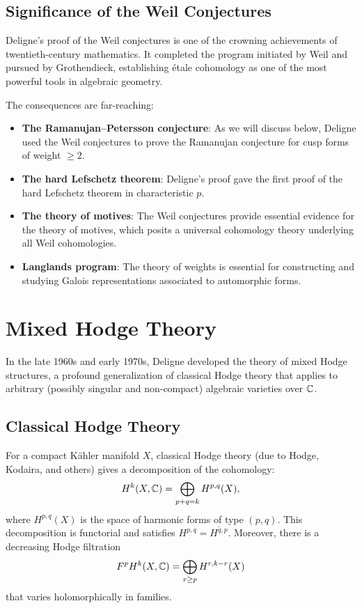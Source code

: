 \subsection{Significance of the Weil Conjectures}

Deligne's proof of the Weil conjectures is one of the crowning achievements of twentieth-century mathematics. It completed the program initiated by Weil and pursued by Grothendieck, establishing \'etale cohomology as one of the most powerful tools in algebraic geometry.

The consequences are far-reaching:
\begin{itemize}
    \item \textbf{The Ramanujan--Petersson conjecture}: As we will discuss below, Deligne used the Weil conjectures to prove the Ramanujan conjecture for cusp forms of weight \(\geq 2\).
    \item \textbf{The hard Lefschetz theorem}: Deligne's proof gave the first proof of the hard Lefschetz theorem in characteristic \(p\).
    \item \textbf{The theory of motives}: The Weil conjectures provide essential evidence for the theory of motives, which posits a universal cohomology theory underlying all Weil cohomologies.
    \item \textbf{Langlands program}: The theory of weights is essential for constructing and studying Galois representations associated to automorphic forms.
\end{itemize}

\section{Mixed Hodge Theory}

In the late 1960s and early 1970s, Deligne developed the theory of mixed Hodge structures, a profound generalization of classical Hodge theory that applies to arbitrary (possibly singular and non-compact) algebraic varieties over \(\mathbb{C}\).

\subsection{Classical Hodge Theory}

For a compact K\"ahler manifold \(X\), classical Hodge theory (due to Hodge, Kodaira, and others) gives a decomposition of the cohomology:
\[
H^k(X, \mathbb{C}) = \bigoplus_{p+q=k} H^{p,q}(X),
\]
where \(H^{p,q}(X)\) is the space of harmonic forms of type \((p,q)\). This decomposition is functorial and satisfies \(H^{p,q} = \overline{H^{q,p}}\). Moreover, there is a decreasing Hodge filtration
\[
F^p H^k(X, \mathbb{C}) = \bigoplus_{r \geq p} H^{r,k-r}(X)
\]
that varies holomorphically in families.

